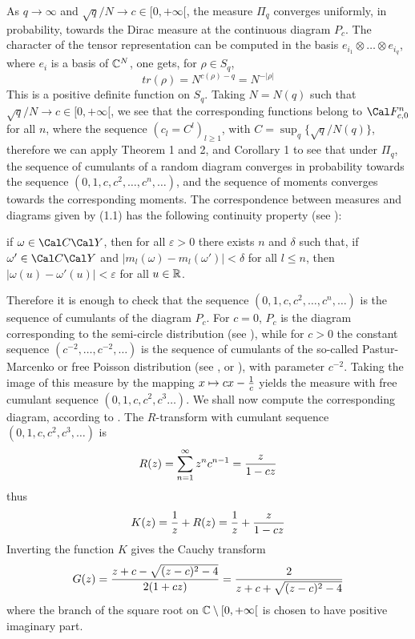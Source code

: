 As $q\to\infty$ and $\sqrt{q}/N\to c\in[0,+\infty[$, the measure $\Pi_q$
converges uniformly, in probability,
towards the Dirac measure  at the continuous diagram $P_c$.
\endproclaim
{}
The character of the tensor representation can be computed in the basis
$e_{i_1}\otimes \ldots \otimes e_{i_q}$, where $e_i$ is a basis of $\Bbb C^N$,
one gets, for $\rho\in S_q$,
$$tr(\rho)=N^{c(\rho)-q}=N^{-\vert\rho\vert}$$
This is a positive definite function on $S_q$. Taking $N=N(q)$ such that 
$\sqrt{q}/N\to c\in[0,+\infty[$, we see that the corresponding functions 
  belong to $\Cal F_{c,0}^n$
for all $n$, where the sequence $(c_l=C^l)_{l\geq
1}$,  with $C=\sup_q\{\sqrt{q}/N(q)\}$, 
therefore we can apply Theorem 1 and 2, and Corollary 1 
to see that under $\Pi_q$,  the sequence of  cumulants of a random diagram
converges in probability
 towards the sequence   
   $(0,1,c,c^2,\ldots, c^n,\ldots)$,
    and the sequence of moments converges towards
   the corresponding moments.  The correspondence between measures and diagrams
   given by (1.1) has the following continuity property (see \cite{K}): \par
   if 
  $\omega\in \Cal C\Cal Y$,
  then for all $\varepsilon>0$ there exists $n$ and $\delta$ such that, if
  $\omega'\in\Cal C\Cal Y$ and 
  $|m_l(\omega)-m_l(\omega')|<\delta$ for all $l\leq n$,  then
  $|\omega(u)-\omega'(u)\vert<\varepsilon$ for all $u\in\Bbb R$. 
  \par
  Therefore it is
  enough to check that the sequence $(0,1,c,c^2,\ldots, c^n,\ldots)$ is the
  sequence of cumulants of the diagram $P_c$. For $c=0$, $P_c$ is the diagram
  corresponding to the semi-circle distribution (see \cite{K}), while for 
    $c>0$
   the constant sequence 
  $(c^{-2},\ldots, c^{-2},\ldots)$ 
  is the sequence of cumulants of the so-called
  Pastur-Marcenko or free Poisson distribution (see \cite{PM}, or
  \cite{VDN}), with parameter $c^{-2}$. Taking the image of this measure by
  the mapping $x\mapsto cx-{1\over c}$  yields the measure with free cumulant
  sequence $(0,1,c,c^2,c^3\ldots)$. We shall now compute the
  corresponding diagram, according to \cite{K}. 
The $R$-transform 
with cumulant sequence $(0,1,c,c^2,c^3,\ldots)$ is 
$$R(z)=\sum_{n=1}^{\infty}z^nc^{n-1}={z\over 1-cz}$$
 thus 
  $$K(z)={1\over z}+R(z)=
  {1\over z}+{z\over 1-cz}$$ Inverting the function $K$ gives the Cauchy
 transform 
$$G(z)={z+c-\sqrt{(z-c)^2-4}\over 2(1+cz)}={2\over z+c+\sqrt{(z-c)^2-4}}$$
where the branch of the square root on $\Bbb C\setminus [0,+\infty[$
is chosen to have positive imaginary part. 
